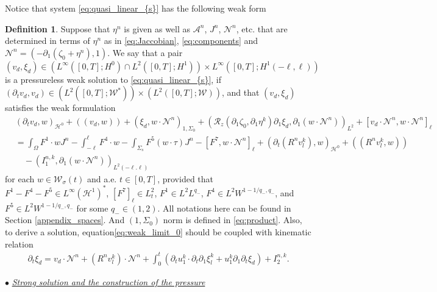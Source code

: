 \documentclass[letterpaper,reqno,10pt,twoside]{amsart}
\theoremstyle{definition}
\newtheorem{definition}{Definition}[section]
\theoremstyle{remark}
\def\p{\partial}
\def\Om{\Omega}
\begin{document}
	Notice that system \eqref{eq:quasi_linear_{s}} has the following weak form
	\begin{definition} \label{def:weak1}  Suppose that $\eta^{n}$ is given as well as $\mathcal{A}^{n}$, $J^{n}$, $\mathcal{N}^{n}$, etc. that are determined in terms of $\eta^{n}$ as in \eqref{eq:Jaccobian}, \eqref{eq:components} and  $\mathcal{N}^{n} = (-\p_1(\zeta_0 + \eta^{n}), 1)$. We say that a pair $(v_{d}, \xi_{d}) \in \left(L^\infty([0,T]; H^0)\cap L^2([0,T]; H^1) \right) \times L^\infty([0,T];H^1(-\ell,\ell))$ is a pressureless weak solution to \eqref{eq:quasi_linear_{s}}, if $(\p_tv_{d},v_{d}) \in (L^2([0,T];\mathcal{W}^{*}))\times (L^2([0,T];\mathcal{W}))$, and that $(v_{d}, \xi_{d})$ satisfies the weak formulation
		\begin{equation}\label{eq:weak_limit_0}
			\begin{aligned}
				& (\p_tv_{d}, w)_{\mathcal{H}^0}+((v_{d},w))+ (\xi_{d}, w\cdot\mathcal{N}^{n})_{1,\Sigma_{0}}+(\mathcal{R}_{z}(\partial_{1}\zeta_{0},\partial_{1}\eta^{k})\partial_{1}\xi_{d},\partial_{1}(w\cdot\mathcal{N}^{n}))_{L^{2}}+ [v_{d}\cdot\mathcal{N}^{n},w\cdot\mathcal{N}^{n}]_\ell\\ &
				=\int_\Om F^1\cdot wJ^{n}-\int_{-\ell}^{\ell} F^4\cdot w-\int_{\Sigma_s}F^5(w\cdot\tau)J^{n} -[F^7,w\cdot\mathcal{N}^{n}]_\ell+(\p_{t}(R^{n}v_{l}^{k}),w)_{\mathcal{H}^{0}}+((R^{n}v_{l}^{k},w))\\
				&\quad-(I^{n,k}_{1},\p_{1}(w\cdot \mathcal{N}^{n}))_{L^{2}(-\ell.\ell)}
			\end{aligned}
		\end{equation}
		for each $w\in \mathcal{W}_{\sigma}(t)$ and a.e. $t\in [0, T]$, provided that $F^1-F^4-F^5\in L^\infty (\mathcal{H}^1)^\ast$, $[F^7]_\ell\in L^2_t$, $F^1\in L^2L^{q_-}$, $F^4\in L^2W^{1-1/q_-,q_-}$, and $F^5\in L^2W^{1-1/q_-,q_-}$ for some $q_-\in (1, 2)$.  All notations here can be found in Section \ref{appendix_spaces}. And $(1,\Sigma_{0})$ norm is defined in \eqref{eq:product}. Also, to derive a solution, equation\eqref{eq:weak_limit_0} should be coupled with kinematic relation
		\begin{align} \label{eq:kinematic_0}
			\partial_{t}\xi_{d}=v_{d}\cdot \mathcal{N}^{n}+(R^{n}v_{l}^{k})\cdot \mathcal{N}^{n}+\int_{0}^{t}(\partial_{t}u_{1}^{k}\cdot\partial_{t}\p_{1}\xi_{l}^{k}+u_{1}^{k}\partial_{1}\partial_{t}\xi_{d})+I^{n,k}_{2}.
		\end{align}
	\end{definition}
	
	\noindent $\bullet$ \underline{\textsl{Strong solution and the construction of the pressure}}
	
\end{document}

